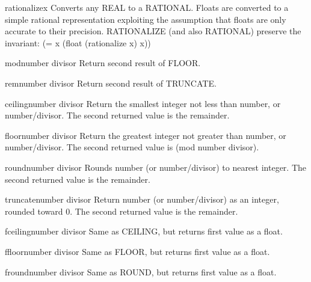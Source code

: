 \documentclass[10pt,english]{book}
\begin{document}
\begin{function}{rationalize}{x}
  Converts any REAL to a RATIONAL.  Floats are converted to a simple rational
  representation exploiting the assumption that floats are only accurate to
  their precision.  RATIONALIZE (and also RATIONAL) preserve the invariant:
      (= x (float (rationalize x) x))
\end{function}

\begin{function}{mod}{number divisor}
  Return second result of FLOOR.
\end{function}

\begin{function}{rem}{number divisor}
  Return second result of TRUNCATE.
\end{function}

\begin{function}{ceiling}{number \op divisor}
  Return the smallest integer not less than number, or number/divisor.
  The second returned value is the remainder.
\end{function}

\begin{function}{floor}{number \op divisor}
  Return the greatest integer not greater than number, or number/divisor.
  The second returned value is (mod number divisor).
\end{function}

\begin{function}{round}{number \op divisor}
  Rounds number (or number/divisor) to nearest integer.
  The second returned value is the remainder.
\end{function}

\begin{function}{truncate}{number \op divisor}
  Return number (or number/divisor) as an integer, rounded toward 0.
  The second returned value is the remainder.
\end{function}

\begin{function}{fceiling}{number \op divisor}
  Same as CEILING, but returns first value as a float.
\end{function}

\begin{function}{ffloor}{number \op divisor}
  Same as FLOOR, but returns first value as a float.
\end{function}

\begin{function}{fround}{number \op divisor}
  Same as ROUND, but returns first value as a float.
\end{function}
\end{document}
